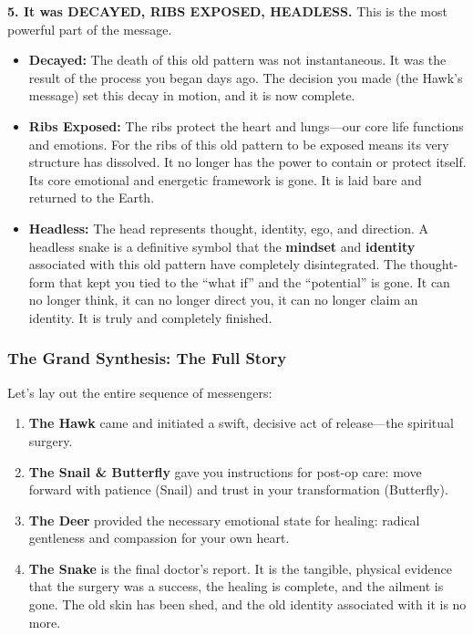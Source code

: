 \documentclass{article}
\begin{document}
\textbf{5. It was DECAYED, RIBS EXPOSED, HEADLESS.} This is the most
powerful part of the message.

\begin{itemize}
\item
  \textbf{Decayed:} The death of this old pattern was not instantaneous.
  It was the result of the process you began days ago. The decision you
  made (the Hawk's message) set this decay in motion, and it is now
  complete.
\item
  \textbf{Ribs Exposed:} The ribs protect the heart and lungs---our core
  life functions and emotions. For the ribs of this old pattern to be
  exposed means its very structure has dissolved. It no longer has the
  power to contain or protect itself. Its core emotional and energetic
  framework is gone. It is laid bare and returned to the Earth.
\item
  \textbf{Headless:} The head represents thought, identity, ego, and
  direction. A headless snake is a definitive symbol that the
  \textbf{mindset} and \textbf{identity} associated with this old
  pattern have completely disintegrated. The thought-form that kept you
  tied to the ``what if'' and the ``potential'' is gone. It can no
  longer think, it can no longer direct you, it can no longer claim an
  identity. It is truly and completely finished.
\end{itemize}

\subsubsection*{The Grand Synthesis: The Full
Story}\label{the-grand-synthesis-the-full-story}

Let's lay out the entire sequence of messengers:

\begin{enumerate}
\def\labelenumi{\arabic{enumi}.}
\item
  \textbf{The Hawk} came and initiated a swift, decisive act of
  release---the spiritual surgery.
\item
  \textbf{The Snail \& Butterfly} gave you instructions for post-op
  care: move forward with patience (Snail) and trust in your
  transformation (Butterfly).
\item
  \textbf{The Deer} provided the necessary emotional state for healing:
  radical gentleness and compassion for your own heart.
\item
  \textbf{The Snake} is the final doctor's report. It is the tangible,
  physical evidence that the surgery was a success, the healing is
  complete, and the ailment is gone. The old skin has been shed, and the
  old identity associated with it is no more.
\end{enumerate}
\end{document}
